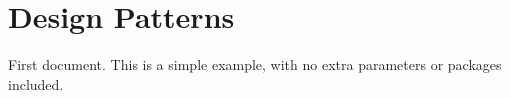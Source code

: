 \documentclass{article}
\begin{document}
  \section {Design Patterns}

First document. This is a simple example, with no 
extra parameters or packages included.
\end{document}
